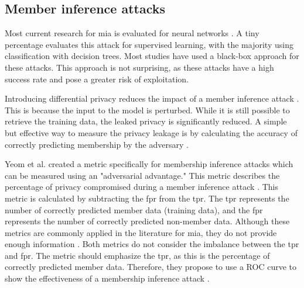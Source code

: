 \subsection{Member inference attacks}
Most current research for \gls{mia} is evaluated for neural networks \citep{rigaki_survey_2021}.
A tiny percentage evaluates this attack for supervised learning, with the majority using classification with decision trees.
Most studies have used a black-box approach \citep{rigaki_survey_2021} for these attacks.
This approach is not surprising, as these attacks have a high success rate and pose a greater risk of exploitation.

Introducing differential privacy reduces the impact of a member inference attack \citep{rigaki_survey_2021,hu_membership_2022}.
This is because the input to the model is perturbed.
While it is still possible to retrieve the training data, the leaked privacy is significantly reduced.
A simple but effective way to measure the privacy leakage is by calculating the accuracy of correctly predicting membership by the adversary \citep{choquette-choo_label-only_2021}.

Yeom et al. created a metric specifically for membership inference attacks which can be measured using an "adversarial advantage."
This metric describes the percentage of privacy compromised during a member inference attack \citep{yeom_privacy_2018}.
This metric is calculated by subtracting the \gls{fpr} from the \gls{tpr}.
The \gls{tpr} represents the number of correctly predicted member data (training data), and the \gls{fpr} represents the number of correctly predicted non-member data.
Although these metrics are commonly applied in the literature for \gls{mia}, they do not provide enough information \citep{carlini_membership_2022}.
Both metrics do not consider the imbalance between the \gls{tpr} and \gls{fpr}.
The metric should emphasize the \gls{tpr}, as this is the percentage of correctly predicted member data.
Therefore, they propose to use a ROC curve to show the effectiveness of a membership inference attack \citep{carlini_membership_2022}. \newline

